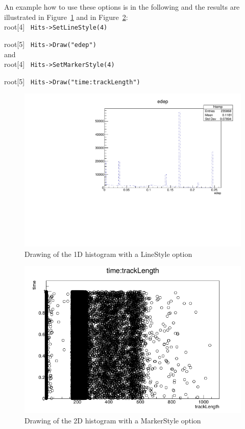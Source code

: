 \documentclass[12pt]{article}
\begin{document}
An example how to use these options is in the following and the results are illustrated in Figure~\ref{fig:1Dhist_linestyle} and in Figure~\ref{fig:2Dhist_markerstyle}:\\

root[4] \verb| Hits->SetLineStyle(4) |

root[5] \verb| Hits->Draw("edep") | \\

and \\

root[4] \verb| Hits->SetMarkerStyle(4) |

root[5] \verb| Hits->Draw("time:trackLength") | \\

\begin{figure}[h]
\centering
\includegraphics[scale=0.5]{figs/1Dhist_linestyle.pdf}
\caption{Drawing of the 1D histogram with a LineStyle option}
\label{fig:1Dhist_linestyle}
\end{figure}

\begin{figure}[h]
\centering
\includegraphics[scale=0.5]{figs/2Dhist_markerstyle.png}
\caption{Drawing of the 2D histogram with a MarkerStyle option}
\label{fig:2Dhist_markerstyle}
\end{figure}
\end{document}
